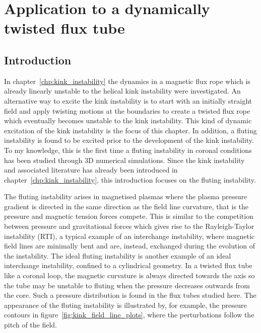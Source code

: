 \chapter{Application to a dynamically twisted flux tube}

\label{chp:kink_instability_straight}

\graphicspath{{images/kink_instability_straight/}}

\section{Introduction}

In chapter~\ref{chp:kink_instability} the dynamics in a magnetic flux rope which is already linearly unstable to the helical kink instability were investigated. An alternative way to excite the kink instability is to start with an initially straight field and apply twisting motions at the boundaries to create a twisted flux rope which eventually becomes unstable to the kink instability. This kind of dynamic excitation of the kink instability is the focus of this chapter. In addition, a fluting instability is found to be excited prior to the development of the kink instability. To my knowledge, this is the first time a fluting instability in coronal conditions has been studied through 3D numerical simulations. Since the kink instability and associated literature has already been introduced in chapter~\ref{chp:kink_instability}, this introduction focuses on the fluting instability.

The fluting instability arises in magnetised plasmas where the plasma pressure gradient is directed in the same direction as the field line curvature, that is the pressure and magnetic tension forces compete. This is similar to the competition between pressure and gravitational forces which gives rise to the Rayleigh-Taylor instability (RTI), a typical example of an interchange instability, where magnetic field lines are minimally bent and are, instead, exchanged during the evolution of the instability. The ideal fluting instability is another example of an ideal interchange instability, confined to a cylindrical geometry. In a twisted flux tube like a coronal loop, the magnetic curvature is always directed towards the axis so the tube may be unstable to fluting when the pressure decreases outwards from the core. Such a pressure distribution is found in the flux tubes studied here. The appearance of the fluting instability is illustrated by, for example, the pressure contours in figure~\ref{fig:kink_field_line_plots}, where the perturbations follow the pitch of the field.

